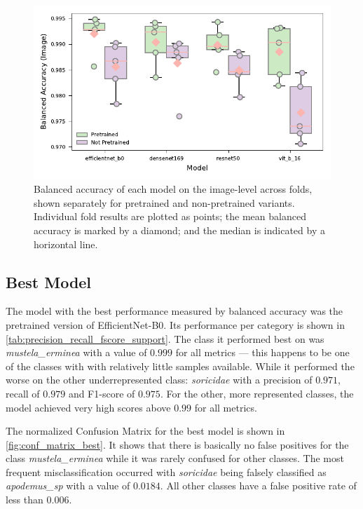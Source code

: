     

    \begin{figure}[ht]
    \centering
    \includegraphics{figures/bal_acc_img.pdf}
    \caption{Balanced accuracy of each model on the image-level across folds, shown separately for pretrained and non-pretrained variants. Individual fold results are plotted as points; the mean balanced accuracy is marked by a diamond; and the median is indicated by a horizontal line.}
    \label{fig:bal_acc_img}
    \end{figure}

    \subsection{Best Model}

    The model with the best performance measured by balanced accuracy was the pretrained version of EfficientNet-B0.
    Its performance per category is shown in \autoref{tab:precision_recall_fscore_support}.
    The class it performed best on was \textit{mustela\_erminea} with a value of \(0.999\) for all metrics --- this happens to be one of the classes with with relatively little samples available.
    While it performed the worse on the other underrepresented class: \textit{soricidae} with a precision of \(0.971\), recall of \(0.979\) and F1-score of \(0.975\).
    For the other, more represented classes, the model achieved very high scores above \(0.99\) for all metrics.
    
    The normalized Confusion Matrix for the best model is shown in \autoref{fig:conf_matrix_best}.
    It shows that there is basically no false positives for the class \textit{mustela\_erminea} while it was rarely confused for other classes.
    The most frequent misclassification occurred with \textit{soricidae} being falsely classified as \textit{apodemus\_sp} with a value of \(0.0184\).
    All other classes have a false positive rate of less than \(0.006\).

